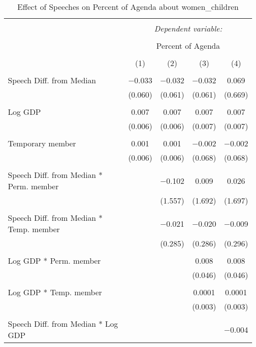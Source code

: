
\begin{table}[!htbp] \centering 
  \caption{Effect of Speeches on Percent of Agenda about  women_children} 
  \label{} 
\begin{tabular}{@{\extracolsep{5pt}}lcccc} 
\\[-1.8ex]\hline 
\hline \\[-1.8ex] 
 & \multicolumn{4}{c}{\textit{Dependent variable:}} \\ 
\cline{2-5} 
\\[-1.8ex] & \multicolumn{4}{c}{Percent of Agenda} \\ 
\\[-1.8ex] & (1) & (2) & (3) & (4)\\ 
\hline \\[-1.8ex] 
 Speech Diff. from Median & $-$0.033 & $-$0.032 & $-$0.032 & 0.069 \\ 
  & (0.060) & (0.061) & (0.061) & (0.669) \\ 
  & & & & \\ 
 Log GDP & 0.007 & 0.007 & 0.007 & 0.007 \\ 
  & (0.006) & (0.006) & (0.007) & (0.007) \\ 
  & & & & \\ 
 Temporary member & 0.001 & 0.001 & $-$0.002 & $-$0.002 \\ 
  & (0.006) & (0.006) & (0.068) & (0.068) \\ 
  & & & & \\ 
 Speech Diff. from Median * Perm. member &  & $-$0.102 & 0.009 & 0.026 \\ 
  &  & (1.557) & (1.692) & (1.697) \\ 
  & & & & \\ 
 Speech Diff. from Median * Temp. member &  & $-$0.021 & $-$0.020 & $-$0.009 \\ 
  &  & (0.285) & (0.286) & (0.296) \\ 
  & & & & \\ 
 Log GDP * Perm. member &  &  & 0.008 & 0.008 \\ 
  &  &  & (0.046) & (0.046) \\ 
  & & & & \\ 
 Log GDP * Temp. member &  &  & 0.0001 & 0.0001 \\ 
  &  &  & (0.003) & (0.003) \\ 
  & & & & \\ 
 Speech Diff. from Median * Log GDP &  &  &  & $-$0.004 \\ 

\end{tabular}
\end{table}
